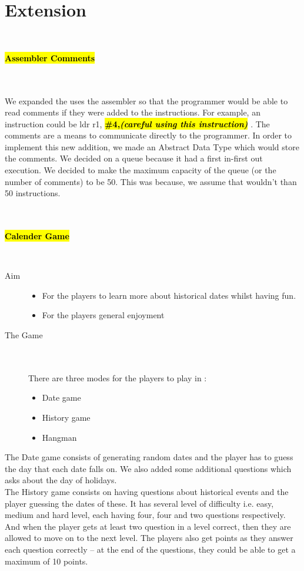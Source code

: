 \documentclass[11pt]{article}
\begin{document}
\section{Extension} \\
    \centerline{\hl{\textbf{Assembler Comments}}}  \\\\
    We expanded the uses  the assembler so that the programmer would be able to
     read comments if they were added to the instructions. For example, an
     instruction could be ldr r1,
    \hl{\textbf{\#4,\emph{(careful using this instruction)}}} . The comments
    are a means to communicate directly to the programmer. In order to implement
     this new addition, we made an Abstract Data Type which would store the
     comments. We decided on a queue because it had a first in-first out
     execution. We decided to make the maximum capacity of the queue (or the
     number of comments) to be 50. This was because, we assume that wouldn’t
     than 50 instructions. \\\\\\
    \centerline{\hl{\textbf{Calender Game}}}  \\
    \begin{description}
    \item[Aim] \hfill
        \begin{itemize}
            \item For the players to learn more about historical dates whilst
            having fun.
            \item For the players general enjoyment
        \end{itemize}
    \item[The Game] \hfill \\\\
    There are three modes for the players to play in :
        \begin{itemize}
            \item Date game
            \item History game
            \item Hangman
        \end{itemize}
    \end{description}
    The Date game consists of generating random dates and the player has to
    guess the day that each date falls on. We also added some additional
    questions which asks about the day of holidays.\\
    The History game consists on having questions about historical events and
    the player guessing the dates of these. It has several level of difficulty
    i.e. easy, medium and hard level, each having four, four and two questions
    respectively. And when the player gets at least two question in a level
    correct, then they are allowed to move on to the next level. The players
     also get points as they answer each question correctly – at the end of
     the questions, they could be able to get a maximum of 10 points. \\
\end{document}
